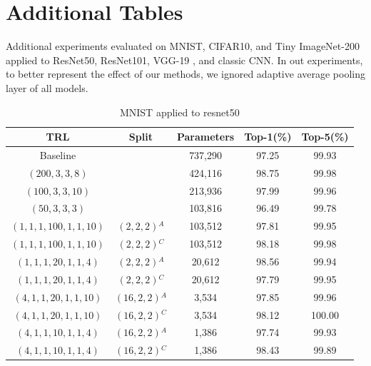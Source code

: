 \documentclass{article}
\begin{document}
\section{Additional Tables}
\label{additional-tables}
Additional experiments evaluated on MNIST, CIFAR10, and Tiny ImageNet-200 applied to ResNet50, ResNet101, VGG-19 , and classic CNN. In out experiments, to better represent the effect of our methods, we ignored adaptive average pooling layer of all models. 

\begin{table}
	\caption{MNIST applied to resnet50}
	\label{atab-1}
	\centering
	\begin{tabular}{c c c c c}
		\toprule
		\textbf{TRL} & \textbf{Split} & \textbf{Parameters} & \textbf{Top-1(\%)} & \textbf{Top-5(\%)} \\
		\midrule
		Baseline & & 737,290 & 97.25 & 99.93 \\
		$(200,3,3,8)$ & & 424,116 & 98.75 & 99.98 \\
		$(100,3,3,10)$ & & 213,936 & 97.99 & 99.96 \\
		$(50,3,3,3)$ & & 103,816 & 96.49 & 99.78 \\
		$(1,1,1,100,1,1,10)$ & $(2,2,2)$$^A$ & 103,512 & 97.81 & 99.95 \\
		$(1,1,1,100,1,1,10)$ & $(2,2,2)$$^C$ & 103,512 & 98.18 & 99.98 \\
		$(1,1,1,20,1,1,4)$ & $(2,2,2)$$^A$ & 20,612 & 98.56 & 99.94 \\
		$(1,1,1,20,1,1,4)$ & $(2,2,2)$$^C$ & 20,612 & 97.79 & 99.95 \\
		$(4,1,1,20,1,1,10)$ & $(16,2,2)$$^A$ & 3,534 & 97.85 & 99.96 \\
		$(4,1,1,20,1,1,10)$ & $(16,2,2)$$^C$ & 3,534 & 98.12 & 100.00 \\
		$(4,1,1,10,1,1,4)$ & $(16,2,2)$$^A$ & 1,386 & 97.74 & 99.93 \\
		$(4,1,1,10,1,1,4)$ & $(16,2,2)$$^C$ & 1,386 & 98.43 & 99.89 \\
		\hline
	\end{tabular}
\end{table}
\end{document}
